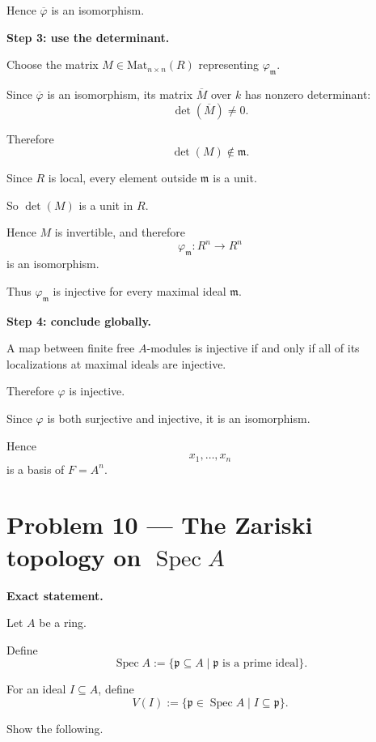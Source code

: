 \documentclass[12pt,a4paper]{article}
\DeclareMathOperator{\Spec}{Spec}
\newcommand{\Mat}{\mathrm{Mat}}
\theoremstyle{plain}
\theoremstyle{definition}      %
\begin{document}
	Hence \(\overline{\varphi}\) is an isomorphism.
	
	\medskip
	\textbf{Step 3: use the determinant.}
	
	Choose the matrix \(M\in \Mat_{n\times n}(R)\) representing \(\varphi_{\mathfrak m}\).
	
	Since \(\overline{\varphi}\) is an isomorphism, its matrix \(\overline{M}\) over \(k\) has nonzero determinant:
	\[
	\det(\overline{M})\neq 0.
	\]
	
	Therefore
	\[
	\det(M)\notin \mathfrak m.
	\]
	
	Since \(R\) is local, every element outside \(\mathfrak m\) is a unit.
	
	So \(\det(M)\) is a unit in \(R\).
	
	Hence \(M\) is invertible, and therefore
	\[
	\varphi_{\mathfrak m}:R^n\longrightarrow R^n
	\]
	is an isomorphism.
	
	Thus \(\varphi_{\mathfrak m}\) is injective for every maximal ideal \(\mathfrak m\).
	
	\medskip
	\textbf{Step 4: conclude globally.}
	
	A map between finite free \(A\)-modules is injective if and only if all of its localizations at maximal ideals are injective.
	
	Therefore \(\varphi\) is injective.
	
	Since \(\varphi\) is both surjective and injective, it is an isomorphism.
	
	Hence
	\[
	x_1,\dots,x_n
	\]
	is a basis of \(F=A^n\).
	
	\bigskip
	\bigskip
	
	\section*{Problem 10 — The Zariski topology on \(\Spec A\)}
	
	\textbf{Exact statement.}
	
	Let \(A\) be a ring.
	
	Define
	\[
	\Spec A
	:=
	\{\mathfrak p\subseteq A \mid \mathfrak p \text{ is a prime ideal}\}.
	\]
	
	For an ideal \(I\subseteq A\), define
	\[
	V(I)
	:=
	\{\mathfrak p\in \Spec A \mid I\subseteq \mathfrak p\}.
	\]
	
	Show the following.
	
\end{document}
